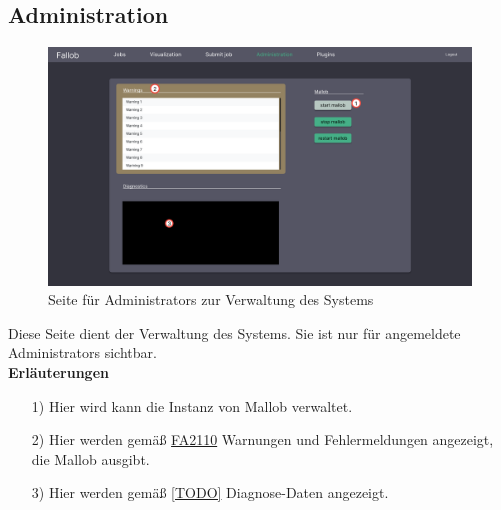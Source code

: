 \subsection{Administration}
\label{pages:admin}
\begin{figure}[H]
    \centering
    \includegraphics[width=\textwidth]{images-interface/v4_interface/admin_page_4.pdf}
    \caption{Seite für \glspl{Administrator} zur Verwaltung des Systems}
    \label{fig:admin-page}
\end{figure}
Diese Seite dient der Verwaltung des Systems. Sie ist nur für angemeldete \glspl{Administrator} sichtbar. \\

\textbf{Erläuterungen}
\begin{itemize}
    \item[1)] Hier wird kann die Instanz von Mallob verwaltet.
    \item[2)] Hier werden gemäß \hyperref[FA:Web-Interface:Anzeigen von Warungen und Fehlermeldungen]{FA2110} Warnungen und Fehlermeldungen angezeigt, die Mallob ausgibt.
    \item[3)] Hier werden gemäß \hyperref[]{[TODO]} Diagnose-Daten angezeigt.
\end{itemize}

